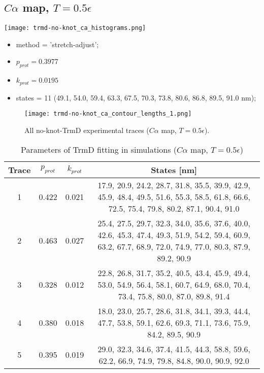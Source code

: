 \subsection{$C\alpha$ map, $T=0.5\epsilon$}
\label{subsec:no-knot-trmd-ca}
\begin{minipage}[c]{0.7\textwidth}
    \texttt{[image: trmd-no-knot\_ca\_histograms.png]}
\end{minipage}
\hfill
\begin{minipage}[c]{0.45\textwidth}
    \begin{itemize}
        \item method = 'stretch-adjust';
        \item $p_{prot}=0.3977$
        \item $k_{prot}=0.0195$
        \item states = 11 (49.1, 54.0, 59.4, 63.3, 67.5, 70.3, 73.8, 80.6, 86.8, 89.5, 91.0 nm);
    \end{itemize}
\end{minipage}

\begin{figure}
    \centering
    \texttt{[image: trmd-no-knot\_ca\_contour\_lengths\_1.png]}
    \caption{All no-knot-TrmD experimental traces ($C\alpha$ map, $T=0.5\epsilon$).}
    \label{fig:no-knot-trmd-ca-cl1}
\end{figure}

\begin{table}
    \tiny
    \centering
    \caption{Parameters of TrmD fitting in simulations ($C\alpha$ map, $T=0.5\epsilon$)}
    \label{tab:no-knot-trmd-ca-parameters}
    \begin{tabular}{c|c|c|c}
        \textbf{Trace} & \textbf{$p_{prot}$} & \textbf{$k_{prot}$} & \textbf{States [nm]}\\\hline
        1 & 0.422 & 0.021 & 17.9, 20.9, 24.2, 28.7, 31.8, 35.5, 39.9, 42.9, 45.9, 48.4, 49.5, 51.6, 55.3, 58.5, 61.8, 66.6, 72.5, 75.4, 79.8, 80.2, 87.1, 90.4, 91.0\\
        2 & 0.463 & 0.027 & 25.4, 27.5, 29.7, 32.3, 34.0, 35.6, 37.6, 40.0, 42.6, 45.3, 47.4, 49.3, 51.9, 54.2, 59.4, 60.9, 63.2, 67.7, 68.9, 72.0, 74.9, 77.0, 80.3, 87.9, 89.2, 90.9\\
        3 & 0.328 & 0.012 & 22.8, 26.8, 31.7, 35.2, 40.5, 43.4, 45.9, 49.4, 53.0, 54.9, 56.4, 58.1, 60.7, 64.9, 68.0, 70.4, 73.4, 75.8, 80.0, 87.0, 89.8, 91.4\\
        4 & 0.380 & 0.018 & 18.0, 23.0, 25.7, 28.6, 31.8, 34.1, 39.3, 44.4, 47.7, 53.8, 59.1, 62.6, 69.3, 71.1, 73.6, 75.9, 84.2, 89.5, 90.9\\
        5 & 0.395 & 0.019 & 29.0, 32.3, 34.6, 37.4, 41.5, 44.3, 58.8, 59.6, 62.2, 66.9, 74.9, 79.8, 84.8, 90.0, 90.9, 92.0\\
    \end{tabular}
\end{table}

